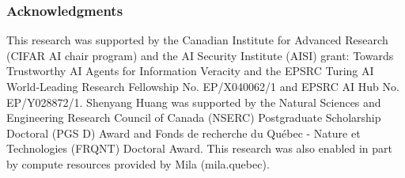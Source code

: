 \subsubsection*{Acknowledgments}
This research was supported by the Canadian Institute for Advanced Research (CIFAR AI chair program) and the AI Security Institute (AISI) grant: Towards Trustworthy AI Agents for Information Veracity and the EPSRC Turing AI World-Leading Research Fellowship No. EP/X040062/1 and EPSRC AI Hub No. EP/Y028872/1. Shenyang Huang was supported by the Natural Sciences and Engineering Research Council of Canada (NSERC) Postgraduate Scholarship Doctoral (PGS D) Award and Fonds de recherche du Québec - Nature et Technologies (FRQNT) Doctoral Award. This research was also enabled in part by compute resources provided by Mila (mila.quebec). 
